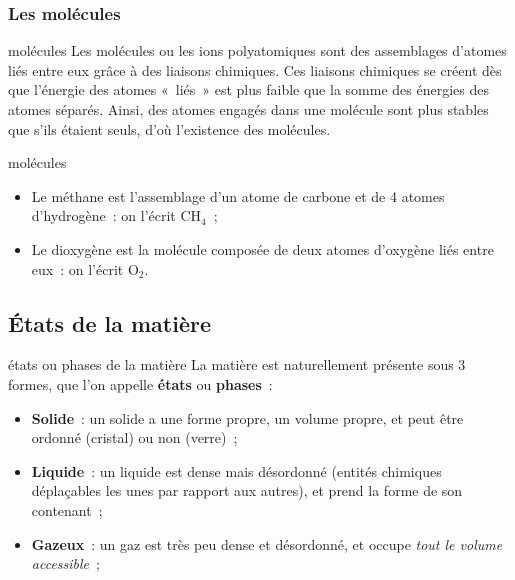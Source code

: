 \documentclass[../main/main.tex]{subfiles}
\begin{document}
\subsubsection{Les molécules}
\begin{tcbraster}[raster columns=2, raster equal height=rows]
    \begin{defi}[label=def:molécules]{molécules}
        Les molécules ou les ions polyatomiques sont des assemblages d'atomes
        liés entre eux grâce à des liaisons chimiques. Ces liaisons chimiques se
        créent dès que l'énergie des atomes «~liés~» est plus faible que la
        somme des énergies des atomes séparés. Ainsi, des atomes engagés dans
        une molécule sont plus stables que s'ils étaient seuls, d'où l'existence
        des molécules.
    \end{defi}
    \begin{exem}[label=exem:molécules]{molécules}
        \begin{itemize}
            \item Le méthane est l'assemblage d'un atome de carbone et de 4
                atomes d'hydrogène~: on l'écrit CH$_4$~;
            \item Le dioxygène est la molécule composée de deux atomes d'oxygène
                liés entre eux~: on l'écrit O$_2$.
        \end{itemize}
    \end{exem}
\end{tcbraster}

\subsection{États de la matière}
\begin{defi}[label=def:etat]{états ou phases de la matière}
    La matière est naturellement présente sous 3 formes, que l'on
    appelle \textbf{états} ou \textbf{phases}~:
    \begin{itemize}
        \item \textbf{Solide}~: un solide a une forme propre, un volume
            propre, et peut être ordonné (cristal) ou non (verre)~;
        \item \textbf{Liquide}~: un liquide est dense mais désordonné
            (entités chimiques déplaçables les unes par rapport aux autres),
            et prend la forme de son contenant~;
        \item \textbf{Gazeux}~: un gaz est très peu dense et désordonné, et
            occupe \textit{tout le volume accessible}~;
    \end{itemize}
\end{defi}
\end{document}
